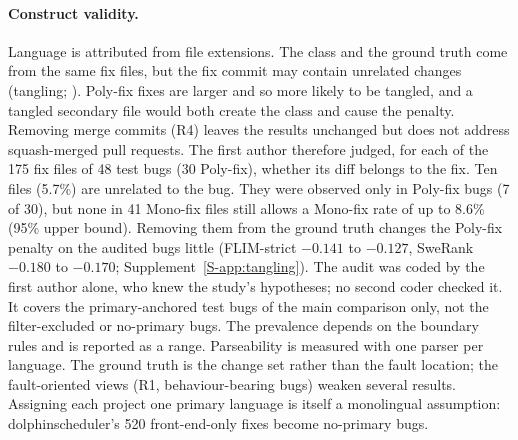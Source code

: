 \documentclass[a4paper,fleqn]{cas-dc}
\begin{document}
\paragraph{Construct validity.} Language is attributed from file extensions.
The class and the ground truth come from the same fix files, but the fix
commit may contain unrelated changes (tangling; \citealt{herzig2013impact}).
Poly-fix fixes are larger and so more likely to be tangled, and a tangled
secondary file would both create the class and cause the penalty. Removing
merge commits (R4) leaves the results unchanged but does not address
squash-merged pull requests. The first author therefore judged, for each of
the 175 fix files of 48 test bugs (30 Poly-fix), whether its diff belongs to
the fix. Ten files (5.7\%) are unrelated to the bug. They were observed only in
Poly-fix bugs (7 of 30), but none in 41 Mono-fix files still allows a Mono-fix
rate of up to 8.6\% (95\% upper bound). Removing them
from the ground truth changes the Poly-fix penalty on the audited bugs little
(FLIM-strict $-0.141$ to $-0.127$, SweRank $-0.180$ to $-0.170$;
Supplement~\ref{S-app:tangling}). The audit was coded by the first author
alone, who knew the study's hypotheses; no second coder checked it. It covers
the primary-anchored test bugs of the main comparison only, not the
filter-excluded or no-primary bugs.
The prevalence depends on the boundary rules and is reported as a range.
Parseability is measured with one parser per language. The ground truth is
the change set rather than the fault location; the fault-oriented views (R1,
behaviour-bearing bugs) weaken several results. Assigning each project one
primary language is itself a monolingual assumption: dolphinscheduler's 520
front-end-only fixes become no-primary bugs.
\end{document}
